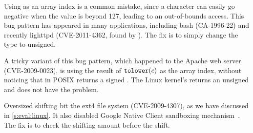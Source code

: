 Using  as an array index is a common mistake, since a
character can easily go negative when the value is beyond 127,
leading to an out-of-bounds access.  This bug pattern has appeared
in many applications, including bash (CA-1996-22) and recently
lighttpd (CVE-2011-4362, found by \sys).  The fix is to simply
change the type to unsigned.

A tricky variant of this bug pattern, which happened to the Apache
web server (CVE-2009-0023), is using the result of $\texttt{tolower}(c)$
as the array index, without noticing that in POSIX 
returns a signed .  The Linux kernel's  returns
an unsigned  and does not have the problem.

Oversized shifting bit the ext4 file system (CVE-2009-4307),
as we have discussed in \autoref{s:eval:linux}.
It also disabled Google Native Client sandboxing mechanism~\cite{nacl}.
The fix is to check the shifting amount before the shift.

